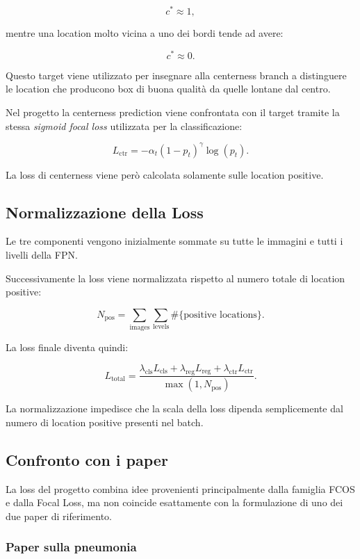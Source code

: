 \[
c^*\approx1,
\]

mentre una location molto vicina a uno dei bordi tende ad avere:

\[
c^*\approx0.
\]

Questo target viene utilizzato per insegnare alla centerness branch a
distinguere le location che producono box di buona qualità da quelle lontane
dal centro.

Nel progetto la centerness prediction viene confrontata con il target tramite
la stessa \textit{sigmoid focal loss} utilizzata per la classificazione:

\[
L_{\text{ctr}}
=
-\alpha_t(1-p_t)^\gamma\log(p_t).
\]

La loss di centerness viene però calcolata solamente sulle location positive.

\subsection{Normalizzazione della Loss}

Le tre componenti vengono inizialmente sommate su tutte le immagini e tutti i
livelli della FPN.

Successivamente la loss viene normalizzata rispetto al numero totale di
location positive:

\[
N_{\text{pos}}
=
\sum_{\text{images}}
\sum_{\text{levels}}
\#\{\text{positive locations}\}.
\]

La loss finale diventa quindi:

\[
L_{\text{total}}
=
\frac{
\lambda_{\text{cls}}L_{\text{cls}}
+
\lambda_{\text{reg}}L_{\text{reg}}
+
\lambda_{\text{ctr}}L_{\text{ctr}}
}
{\max(1,N_{\text{pos}})}.
\]

La normalizzazione impedisce che la scala della loss dipenda semplicemente dal
numero di location positive presenti nel batch.

\subsection{Confronto con i paper}

La loss del progetto combina idee provenienti principalmente dalla famiglia
FCOS e dalla Focal Loss, ma non coincide esattamente con la formulazione di uno
dei due paper di riferimento.

\subsubsection{Paper sulla pneumonia}

